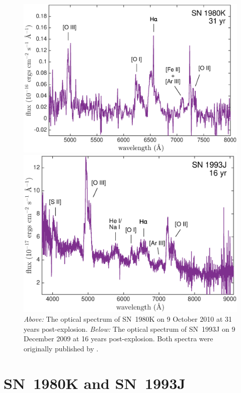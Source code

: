 \begin{figure}
\centering
\includegraphics[clip=true,scale=0.6, trim=20 0 50 20]{chapters/chapter6/figs/80K/80K_spectrum}

\includegraphics[clip=true,scale=0.6, trim=30 0 50 20]{chapters/chapter6/figs/93J/93J_spectrum}
\caption{{\em Above:} The optical spectrum of  SN~1980K on 9 October 2010 at 31 years post-explosion.  {\em Below:}  The optical spectrum of  SN~1993J on 9 December 2009 at 16 years post-explosion. Both spectra were originally published by \citet{Milisavljevic2012}.}
\label{spectra}
\end{figure}

\section{SN~1980K and SN~1993J}

